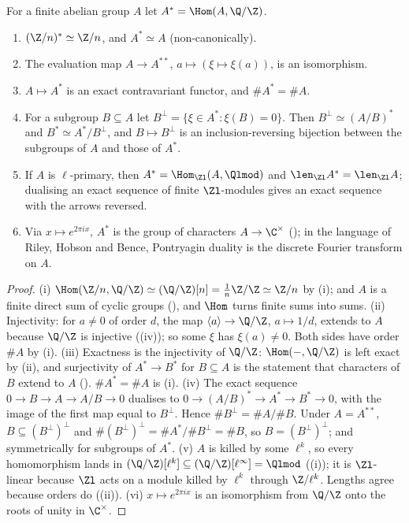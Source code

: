 \begin{theorem}\label{thm:modules:pontryagin-finite}
For a finite abelian group $A$ let $A^*=\Hom(A,\Q/\Z)$.
\begin{enumerate}[label=(\roman*)]
\item $(\Z/n)^*\simeq\Z/n$, and $A^*\simeq A$ (non-canonically).
\item The evaluation map $A\to A^{**}$, $a\mapsto(\xi\mapsto\xi(a))$, is an isomorphism.
\item $A\mapsto A^*$ is an exact contravariant functor, and $\#A^*=\#A$.
\item For a subgroup $B\subseteq A$ let $B^\perp=\{\xi\in A^*:\xi(B)=0\}$. Then $B^\perp\simeq(A/B)^*$ and $B^*\simeq A^*/B^\perp$, and $B\mapsto B^\perp$ is an
inclusion-reversing bijection between the subgroups of $A$ and those of $A^*$.
\item If $A$ is $\ell$-primary, then $A^*=\Hom_{\Zl}(A,\Qlmod)$ and $\len_{\Zl}A^*=\len_{\Zl}A$; dualising an exact sequence of finite $\Zl$-modules
gives an exact sequence with the arrows reversed.
\item Via $x\mapsto e^{2\pi ix}$, $A^*$ is the group of characters $A\to\C^\times$ (); in the language of Riley, Hobson and Bence,
Pontryagin duality is the discrete Fourier transform on $A$.
\end{enumerate}
\end{theorem}

\begin{proof}
(i) $\Hom(\Z/n,\Q/\Z)\simeq(\Q/\Z)[n]=\frac1n\Z/\Z\simeq\Z/n$ by (i); and $A$ is a finite direct sum of cyclic groups
(), and $\Hom$ turns finite sums into sums. (ii) Injectivity: for $a\ne0$ of order $d$, the map $\langle a\rangle\to\Q/\Z$, $a\mapsto1/d$,
extends to $A$ because $\Q/\Z$ is injective ((iv)); so some $\xi$ has $\xi(a)\ne0$. Both sides have order $\#A$ by (i).
(iii) Exactness is the injectivity of $\Q/\Z$: $\Hom(-,\Q/\Z)$ is left exact by (ii), and surjectivity of $A^*\to B^*$ for
$B\subseteq A$ is the statement that characters of $B$ extend to $A$ (). $\#A^*=\#A$ is (i). (iv) The exact sequence $0\to B\to A\to A/B\to0$ dualises to
$0\to(A/B)^*\to A^*\to B^*\to0$, with the image of the first map equal to $B^\perp$. Hence $\#B^\perp=\#A/\#B$. Under $A=A^{**}$, $B\subseteq(B^\perp)^\perp$ and
$\#(B^\perp)^\perp=\#A^*/\#B^\perp=\#B$, so $B=(B^\perp)^\perp$; and symmetrically for subgroups of $A^*$.
(v) $A$ is killed by some $\ell^k$, so every homomorphism lands in $(\Q/\Z)[\ell^k]\subseteq(\Q/\Z)[\ell^\infty]=\Qlmod$ ((i)); it is
$\Zl$-linear because $\Zl$ acts on a module killed by $\ell^k$ through $\Z/\ell^k$. Lengths agree because orders do
((ii)). (vi) $x\mapsto e^{2\pi ix}$ is an isomorphism from $\Q/\Z$ onto the roots of unity in $\C^\times$.
\end{proof}

